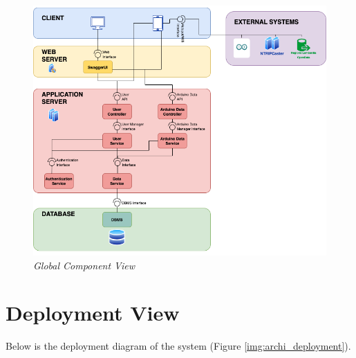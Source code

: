 \begin{figure}[H]
\begin{center}
  \includegraphics[width=\textwidth]{img/archi/components.png}
  \hspace{0.05\linewidth}
  \centering
  \caption{\textit{Global Component View}}
  \label{img:archi_components}
\end{center}
\end{figure}
\clearpage

\section{Deployment View}
Below is the deployment diagram of the system (Figure \ref{img:archi_deployment}).

